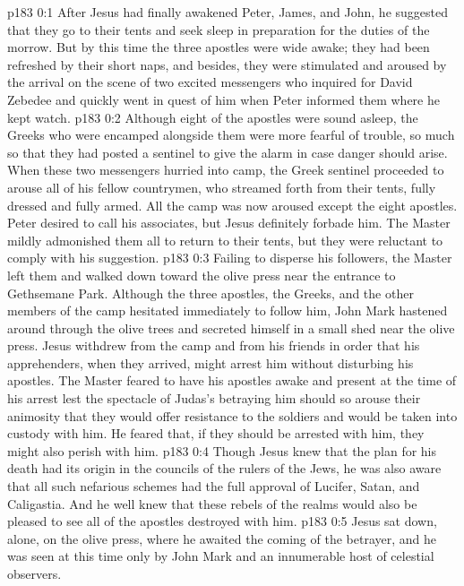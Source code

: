 \author{Midwayer Commission}
\vs p183 0:1 After Jesus had finally awakened Peter, James, and John, he suggested that they go to their tents and seek sleep in preparation for the duties of the morrow. But by this time the three apostles were wide awake; they had been refreshed by their short naps, and besides, they were stimulated and aroused by the arrival on the scene of two excited messengers who inquired for David Zebedee and quickly went in quest of him when Peter informed them where he kept watch.
\vs p183 0:2 Although eight of the apostles were sound asleep, the Greeks who were encamped alongside them were more fearful of trouble, so much so that they had posted a sentinel to give the alarm in case danger should arise. When these two messengers hurried into camp, the Greek sentinel proceeded to arouse all of his fellow countrymen, who streamed forth from their tents, fully dressed and fully armed. All the camp was now aroused except the eight apostles. Peter desired to call his associates, but Jesus definitely forbade him. The Master mildly admonished them all to return to their tents, but they were reluctant to comply with his suggestion.\plusone
\vs p183 0:3 Failing to disperse his followers, the Master left them and walked down toward the olive press near the entrance to Gethsemane Park. Although the three apostles, the Greeks, and the other members of the camp hesitated immediately to follow him, John Mark hastened around through the olive trees and secreted himself in a small shed near the olive press. Jesus withdrew from the camp and from his friends in order that his apprehenders, when they arrived, might arrest him without disturbing his apostles. The Master feared to have his apostles awake and present at the time of his arrest lest the spectacle of Judas’s betraying him should so arouse their animosity that they would offer resistance to the soldiers and would be taken into custody with him. He feared that, if they should be arrested with him, they might also perish with him.
\vs p183 0:4 Though Jesus knew that the plan for his death had its origin in the councils of the rulers of the Jews, he was also aware that all such nefarious schemes had the full approval of Lucifer, Satan, and Caligastia. And he well knew that these rebels of the realms would also be pleased to see all of the apostles destroyed with him.
\vs p183 0:5 Jesus sat down, alone, on the olive press, where he awaited the coming of the betrayer, and he was seen at this time only by John Mark and an innumerable host of celestial observers.
